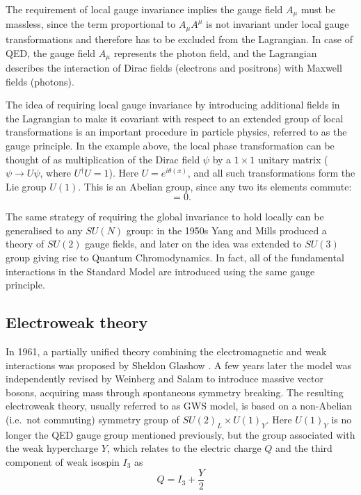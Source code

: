 The requirement of local gauge invariance implies the gauge field $A_\mu$ must be massless, since the term proportional
to $A_\mu A^\mu$ is not invariant under local gauge transformations and therefore has to be excluded from the
Lagrangian. In case of QED, the gauge field $A_\mu$ represents the photon field, and the Lagrangian describes the
interaction of Dirac fields (electrons and positrons) with Maxwell fields (photons).

The idea of requiring local gauge invariance by introducing additional fields in the Lagrangian to make it covariant
with respect to an extended group of local transformations is an important procedure in particle physics, referred to as
the gauge principle. In the example above, the local phase transformation can be thought of as multiplication of the
Dirac field $\psi$ by a $1 \times 1$ unitary matrix ($\psi \rightarrow U \psi$, where $U^{\dag}U = 1$). Here $U = e^{i
\theta(x)}$, and all such transformations form the Lie group $U(1)$. This is an Abelian group, since any two its
elements commute:
\begin{equation}
[e^{i \theta(x)},~e^{i\theta(x')}] = 0.
\end{equation}

The same strategy of requiring the global invariance to hold locally can be generalised to any $SU(N)$ group: in the
1950s Yang and Mills \autocite{Yang_Mills} produced a theory of $SU(2)$ gauge fields, and later on the idea was extended
to $SU(3)$ group giving rise to Quantum Chromodynamics. In fact, all of the fundamental interactions in the Standard
Model are introduced using the same gauge principle.

\newpage
\subsection{Electroweak theory}
\label{ss:electroweak_theory}
In 1961, a partially unified theory combining the electromagnetic and weak interactions was proposed by Sheldon Glashow
\autocite{Glashow}. A few years later the model was independently revised by Weinberg \autocite{Weinberg} and Salam
\autocite{Salam} to introduce massive vector bosons, acquiring mass through spontaneous symmetry breaking. The resulting
electroweak theory, usually referred to as GWS model, is based on a non-Abelian (i.e.\ not commuting) symmetry group of
$SU(2)_L \times U(1)_Y$. Here $U(1)_Y$ is no longer the QED gauge group mentioned previously, but the group associated
with the weak hypercharge $Y$, which relates to the electric charge $Q$ and the third component of weak isospin $I_3$ as
\begin{equation}
Q = I_3 + \frac{Y}{2} 
\end{equation} 

